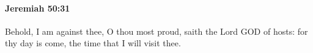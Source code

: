 
		\paragraph{Jeremiah 50:31} %
			\label{JEREMIAH-50-31}

			Behold, I am against thee, O thou most proud, saith the Lord GOD of hosts: for thy day is come, the time that I will visit thee.


